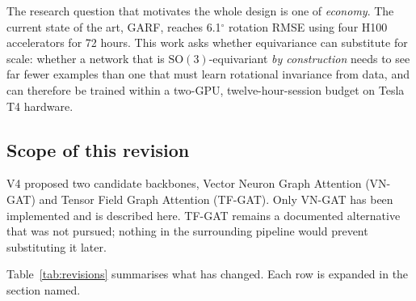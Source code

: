 \documentclass[11pt,a4paper]{report}
\newcommand{\SOthree}{\mathrm{SO}(3)}
\begin{document}
The research question that motivates the whole design is one of \emph{economy}.
The current state of the art, GARF, reaches 6.1$^{\circ}$ rotation RMSE using
four H100 accelerators for 72 hours. This work asks whether equivariance can
substitute for scale: whether a network that is $\SOthree$-equivariant
\emph{by construction} needs to see far fewer examples than one that must learn
rotational invariance from data, and can therefore be trained within a two-GPU,
twelve-hour-session budget on Tesla T4 hardware.

\subsection{Scope of this revision}
\label{sub:scope}

V4 proposed two candidate backbones, Vector Neuron Graph Attention (VN-GAT) and
Tensor Field Graph Attention (TF-GAT). Only VN-GAT has been implemented and is
described here. TF-GAT remains a documented alternative that was not pursued;
nothing in the surrounding pipeline would prevent substituting it later.

Table~\ref{tab:revisions} summarises what has changed. Each row is expanded in
the section named.
\end{document}
